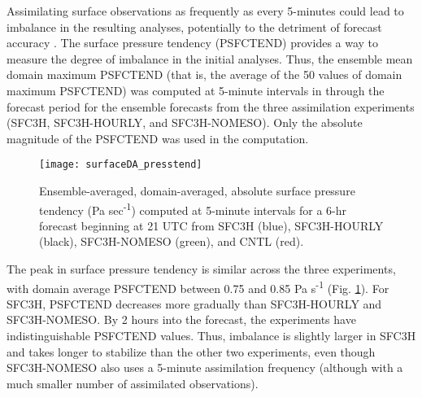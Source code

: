 Assimilating surface observations as frequently as every 5-minutes could lead to imbalance in the resulting analyses, potentially to the detriment of forecast accuracy \citep{greybushetal11}. The surface pressure tendency (PSFCTEND) provides a way to measure the degree of imbalance in the initial analyses. Thus, the ensemble mean domain maximum PSFCTEND (that is, the average of the 50 values of domain maximum PSFCTEND) was computed at 5-minute intervals in through the forecast period for the ensemble forecasts from the three assimilation experiments (SFC3H, SFC3H-HOURLY, and SFC3H-NOMESO). Only the absolute magnitude of the PSFCTEND was used in the computation.
\begin{figure}
\centering
\texttt{[image: surfaceDA\_presstend]}
\caption{Ensemble-averaged, domain-averaged, absolute surface pressure tendency (Pa sec\textsuperscript{-1}) computed at 5-minute intervals for a 6-hr forecast beginning at 21 UTC from SFC3H (blue), SFC3H-HOURLY (black), SFC3H-NOMESO (green), and CNTL (red).}
\label{sfcdapresstend}
\end{figure}
The peak in surface pressure tendency is similar across the three experiments, with domain average PSFCTEND between 0.75 and 0.85 Pa s\textsuperscript{-1} (Fig. \ref{sfcdapresstend}). For SFC3H, PSFCTEND decreases more gradually than SFC3H-HOURLY and SFC3H-NOMESO. By 2 hours into the forecast, the experiments have indistinguishable PSFCTEND values. Thus, imbalance is slightly larger in SFC3H and takes longer to stabilize than the other two experiments, even though SFC3H-NOMESO also uses a 5-minute assimilation frequency (although with a much smaller number of assimilated observations).

